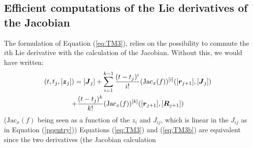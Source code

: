\documentclass{sig-alternate-05-2015} %
\newcommand\ForAuthors[1]%
 {\par\smallskip                     %
  \begin{center}%
   \fbox%
   {\parbox{0.9\linewidth}%
    {\raggedright\sc--- #1}%
   }%
  \end{center}%
  \par\smallskip                     %
 }
\newtheorem{remark}{Remark}
\begin{document}
\subsection{Efficient computations of the Lie derivatives of the Jacobian}

\label{efficientLieJacobian}

The formulation of Equation (\ref{eq:TM3}), 
relies on the possibility to commute the $i$th Lie derivative
with the calculation of the Jacobian. Without this, we would have written:
\begin{multline}
[\J](t,t_j,[{\z}_j]) = [{\J}_j] + \sum\limits_{i=1}^{k-1} \frac{(t-t_j)^i}{i !} (\mbox{Jac}_x(f))^{[i]}([{\r}_{j+1}],[{\J}_j]) \\ +  \frac{(t-t_j)^k}{k !} (\mbox{Jac}_x(f))^{[k]}([{\r}_{j+1}],[\bfm{R}_{j+1}])
\label{eq:TM3b}
\end{multline}
\noindent ($\mbox{Jac}_x(f)$ being seen as a function of the $z_i$ and $J_{ij}$, which 
is linear in the $J_{ij}$ as in Equation (\ref{pqentry}))
Equations (\ref{eq:TM3}) and (\ref{eq:TM3b}) are equivalent since the two derivatives (the Jacobian calculation
\end{document}
